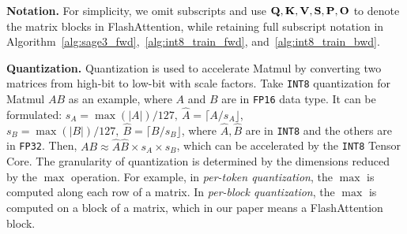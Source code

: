 \textbf{Notation.} For simplicity, we omit subscripts and use $\mathbf{Q}, \mathbf{K}, \mathbf{V}, \mathbf{S}, \mathbf{P}, \mathbf{O}$ to denote the matrix blocks in FlashAttention, while retaining full subscript notation in Algorithm~\ref{alg:sage3_fwd},~\ref{alg:int8_train_fwd}, and~\ref{alg:int8_train_bwd}.


\textbf{Quantization.} Quantization is used to accelerate Matmul by converting two matrices from high-bit to low-bit with scale factors. Take \texttt{INT8} quantization for Matmul $AB$ as an example, where $A$ and $B$ are in \texttt{FP16} data type. It can be formulated: $s_A = \max(|A|)/127, ~\hat A =  \lceil A / s_A \rfloor$, $s_B = \max(|B|)/127, ~\hat B = \lceil B / s_B \rfloor$, where $\hat A, \hat B$ are in \texttt{INT8} and the others are in \texttt{FP32}. Then, $AB \approx \hat A \hat B \times s_A \times s_B$, which can be accelerated by the \texttt{INT8} Tensor Core. The granularity of quantization is determined by the dimensions reduced by the $\max$ operation. For example, in \textit{per-token quantization}, the $\max$ is computed along each row of a matrix. In \textit{per-block quantization}, the $\max$ is computed on a block of a matrix, which in our paper means a FlashAttention block.



